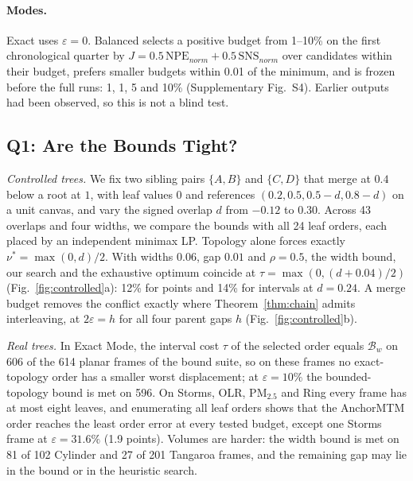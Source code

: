 \paragraph{Modes.} Exact uses $\varepsilon=0$. Balanced selects a positive budget from 1--10\% on the first chronological quarter by $J=0.5\,\mathrm{NPE}_{norm}+0.5\,\mathrm{SNS}_{norm}$ over candidates within their budget, prefers smaller budgets within 0.01 of the minimum, and is frozen before the full runs: 1, 1, 5 and 10\% (Supplementary Fig.~S4). Earlier outputs had been observed, so this is not a blind test.

\subsection{Q1: Are the Bounds Tight?}\label{sec:bounds-eval}
\emph{Controlled trees.} We fix two sibling pairs $\{A,B\}$ and $\{C,D\}$ that merge at $0.4$ below a root at $1$, with leaf values $0$ and references $(0.2,0.5,0.5-d,0.8-d)$ on a unit canvas, and vary the signed overlap $d$ from $-0.12$ to $0.30$. Across 43 overlaps and four widths, we compare the bounds with all 24 leaf orders, each placed by an independent minimax LP. Topology alone forces exactly $\nu^*=\max(0,d)/2$. With widths $0.06$, gap $0.01$ and $\rho=0.5$, the width bound, our search and the exhaustive optimum coincide at $\tau=\max(0,(d+0.04)/2)$ (Fig.~\ref{fig:controlled}a): 12\% for points and 14\% for intervals at $d=0.24$. A merge budget removes the conflict exactly where Theorem~\ref{thm:chain} admits interleaving, at $2\varepsilon=h$ for all four parent gaps $h$ (Fig.~\ref{fig:controlled}b).

\emph{Real trees.} In Exact Mode, the interval cost $\tau$ of the selected order equals $\mathcal{B}_w$ on 606 of the 614 planar frames of the bound suite, so on these frames no exact-topology order has a smaller worst displacement; at $\varepsilon=10\%$ the bounded-topology bound is met on 596. On Storms, OLR, PM$_{2.5}$ and Ring every frame has at most eight leaves, and enumerating all leaf orders shows that the AnchorMTM order reaches the least order error at every tested budget, except one Storms frame at $\varepsilon=31.6\%$ (1.9 points). Volumes are harder: the width bound is met on 81 of 102 Cylinder and 27 of 201 Tangaroa frames, and the remaining gap may lie in the bound or in the heuristic search.

